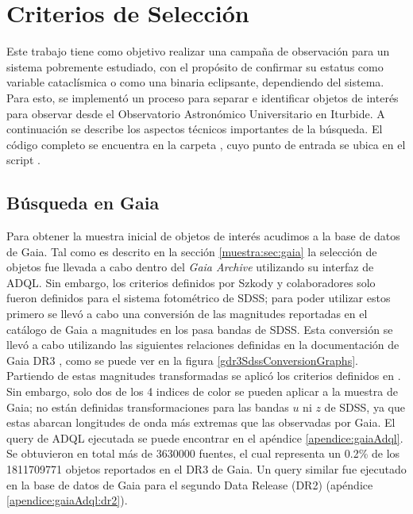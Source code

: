 \section{Criterios de Selección} \label{muestra:crit_seleccion}

Este trabajo tiene como objetivo realizar una campaña de observación para un
sistema pobremente estudiado, con el propósito de confirmar su estatus como
variable cataclísmica o como una binaria eclipsante, dependiendo del sistema.
Para esto, se implementó un proceso para separar e identificar objetos de
interés para observar desde el Observatorio Astronómico Universitario en
Iturbide. A continuación se describe los aspectos técnicos importantes de la
búsqueda. El código completo se encuentra en la carpeta
\href{https://github.com/KnightIV/UANL_MAPTA_Observaciones/tree/main/obsrv_plan}{},
cuyo punto de entrada se ubica en el script
\href{URLhttps://github.com/KnightIV/UANL_MAPTA_Observaciones/blob/main/obsrv_plan/main.py}{}.

\subsection{Búsqueda en Gaia}  \label{muestra:crit_seleccion:busqueda_fotometrica}

Para obtener la muestra inicial de objetos de interés acudimos a la base de
datos de Gaia. Tal como es descrito en la sección \ref{muestra:sec:gaia} la
selección de objetos fue llevada a cabo dentro del \textit{Gaia Archive}
utilizando su interfaz de ADQL. Sin embargo, los criterios definidos por Szkody
y colaboradores solo fueron definidos para el sistema fotométrico de SDSS; para
poder utilizar estos primero se llevó a cabo una conversión de las magnitudes
reportadas en el catálogo de Gaia a magnitudes en los pasa bandas de SDSS. Esta
conversión se llevó a cabo utilizando las siguientes relaciones definidas en la
documentación de Gaia DR3 \citet{gdr3ReleaseDocumentation}, como se puede
ver en la figura \ref{gdr3SdssConversionGraphs}. Partiendo de estas magnitudes
transformadas se aplicó los criterios definidos en
\citet{szkody2002CvSearchSdss}. Sin embargo, solo dos de los 4 indices de color
se pueden aplicar a la muestra de Gaia; no están definidas transformaciones para
las bandas $u$ ni $z$ de SDSS, ya que estas abarcan longitudes de onda más
extremas que las observadas por Gaia. El query de ADQL ejecutada se puede
encontrar en el apéndice \ref{apendice:gaiaAdql}. Se obtuvieron en total más de
\num{3630000} fuentes, el cual representa un 0.2\% de los \num{1811709771} objetos
reportados en el DR3 de Gaia. Un query similar fue ejecutado en la base de datos
de Gaia para el segundo Data Release (DR2) (apéndice \ref{apendice:gaiaAdql:dr2}). 

